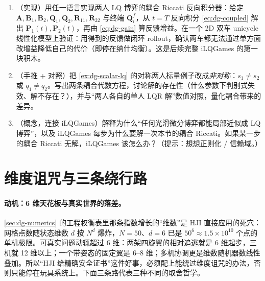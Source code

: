 \begin{practice}
\begin{enumerate}
  \item （实现）用任一语言实现两人 LQ 博弈的耦合 Riccati 反向积分器：给定 $\mathbf A,\mathbf B_1,\mathbf B_2,\mathbf Q_1,\mathbf Q_2,\mathbf R_{11},\mathbf R_{22}$ 与终端 $\mathbf Q_i^f$，从 $t=T$ 反向积分 \cref{eq:dg-coupled} 解出 $\mathbf P_1(t),\mathbf P_2(t)$，再由 \cref{eq:dg-gain} 算反馈增益。在一个 2D 双车 unicycle 线性化模型上验证：用得到的反馈做闭环 rollout，确认两车都无法通过单方面改增益降低自己的代价（即停在纳什均衡）。这是后续完整 iLQGames 的第一块积木。
  \item （手推 + 对照）把 \cref{ex:dg-scalar-lq} 的对称两人标量例子改成\emph{非对称}：$s_1\ne s_2$ 或 $q_1\ne q_2$。写出两条耦合代数方程，讨论解的存在性（什么参数下判别式失效、解不存在？），并与“两人各自的单人 LQR 解”数值对照，量化耦合带来的差异。
  \item （概念，连接 iLQGames）解释为什么“任何光滑微分博弈都能局部近似成 LQ 博弈”，以及 iLQGames 每步为什么要解一次本节的耦合 Riccati。如果某一步的耦合 Riccati 无解，iLQGames 该怎么办？（提示：想想正则化 / 信赖域。）
\end{enumerate}
\end{practice}

\section{维度诅咒与三条绕行路}
\label{sec:dg-curse}

\paragraph{动机：6 维天花板与真实世界的落差。}
\cref{sec:dg-numerics} 的工程权衡表里那条指数增长的“维数”是 HJI 直接应用的死穴：网格点数随状态维数 $d$ 按 $N^d$ 爆炸，$N=50$、$d=6$ 已是 $50^6\approx1.5\times10^{10}$ 个点的单机极限。可真实问题动辄超过 6 维：两架四旋翼的相对追逃就是 6 维起步，三机就 12 维以上；一个带姿态的固定翼是 6--8 维；多机协调更是维数随机器数线性叠加。所以“HJI 给精确安全证书”这件好事，必须配上能绕过维度诅咒的办法，否则只能停在玩具系统上。下面三条路代表三种不同的取舍哲学。

